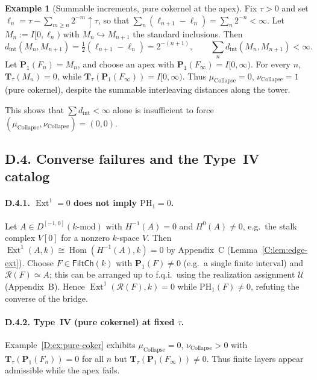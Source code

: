 \documentclass[11pt]{article}
\DeclareMathOperator{\Ext}{Ext}
\DeclareMathOperator{\Hom}{Hom}
\numberwithin{equation}{section}
\theoremstyle{definition}
\newtheorem{example}[theorem]{Example}
\DeclareRobustCommand{\muc}{\mu_{\mathrm{Collapse}}}
\DeclareRobustCommand{\nuc}{\nu_{\mathrm{Collapse}}}
\begin{document}
\begin{example}[Summable increments, pure cokernel at the apex]\label{D:ex:summable}
Fix \(\tau>0\) and set \(\ell_n=\tau-\sum_{m\ge n}2^{-m}\uparrow \tau\), so that
\(\sum_{n}(\ell_{n+1}-\ell_{n})=\sum_{n}2^{-n}<\infty\).
Let \(M_n:=I[0,\ell_n)\) with \(M_{n}\hookrightarrow M_{n+1}\) the standard inclusions.
Then
\[
d_{\mathrm{int}}(M_{n},M_{n+1})=\tfrac12(\ell_{n+1}-\ell_{n})=2^{-(n+1)},\qquad \sum_{n} d_{\mathrm{int}}(M_{n},M_{n+1})<\infty.
\]
Let \(\mathbf{P}_1(F_n)=M_n\), and choose an apex with \(\mathbf{P}_1(F_\infty)=I[0,\infty)\).
For every \(n\), \(\mathbf{T}_\tau(M_n)=0\), while \(\mathbf{T}_\tau(\mathbf{P}_1(F_\infty))=I[0,\infty)\).
Thus \(\muc=0\), \(\nuc=1\) (pure cokernel), despite the summable interleaving distances along the tower.
\end{example}

This shows that \(\sum d_{\mathrm{int}}<\infty\) alone is insufficient to force \((\muc,\nuc)=(0,0)\).

\subsection*{D.4. Converse failures and the Type~IV catalog}

\paragraph{D.4.1. \(\Ext^1=0\) does not imply \(\mathrm{PH}_1=0\).}
Let \(A\in D^{[-1,0]}(k\text{-mod})\) with \(H^{-1}(A)=0\) and \(H^0(A)\ne 0\), e.g.\ the stalk complex \(V[0]\) for a nonzero \(k\)-space \(V\).
Then \(\Ext^1(A,k)\cong \Hom(H^{-1}(A),k)=0\) by Appendix~C (Lemma~\ref{C:lem:edge-ext}).
Choose \(F\in\mathsf{FiltCh}(k)\) with \(\mathbf{P}_1(F)\neq 0\) (e.g.\ a single finite interval) and \(\mathcal{R}(F)\simeq A\); this can be arranged up to f.q.i.\ using the realization assignment \(\mathcal{U}\) (Appendix~B).
Hence \(\Ext^1(\mathcal{R}(F),k)=0\) while \(\mathrm{PH}_1(F)\neq 0\), refuting the converse of the bridge.

\paragraph{D.4.2. Type~IV (pure cokernel) at fixed \(\tau\).}
Example~\ref{D:ex:pure-coker} exhibits \(\muc=0\), \(\nuc>0\) with \(\mathbf{T}_\tau(\mathbf{P}_1(F_n))=0\) for all \(n\) but \(\mathbf{T}_\tau(\mathbf{P}_1(F_\infty))\neq 0\).
Thus finite layers appear admissible while the apex fails.
\end{document}
